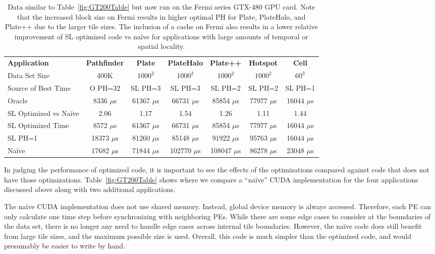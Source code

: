 \documentclass[preprint,nocopyrightspace]{styles/sigplanconf}
\begin{document}
\begin{table}
\centering
\begin{tabular}{|l|c|c|c|c|c|c|}
\hline
{\bf Application} & {\bf Pathfinder} & {\bf Plate} & {\bf PlateHalo} & {\bf Plate++} & {\bf Hotspot} & {\bf Cell} \\
Data Set Size	& 400K	& $1000^2$	& $1000^2$	& $1000^2$	& $1000^2$	& $60^3$	\\
\hline
Source of Best Time & O PH=32 	& SL PH=3	& SL PH=3	& SL PH=2	& SL PH=2	& SL PH=1	\\
Oracle		& 8336 $\mu$s	& 61367 $\mu$s	& 66731 $\mu$s	& 85854 $\mu$s	& 77977	$\mu$s	& 16044 $\mu$s	\\
SL Optimized vs Na\"{i}ve & 2.06 & 1.17		& 1.54		& 1.26		& 1.11		& 1.44		\\
SL Optimized Time & 8572 $\mu$s	& 61367	$\mu$s	& 66731	$\mu$s	& 85854	$\mu$s	& 77977	$\mu$s	& 16044	$\mu$s	\\
SL PH=1		& 18373	$\mu$s	& 81260	$\mu$s	& 85148	$\mu$s	& 91922	$\mu$s	& 95763	$\mu$s	& 16044	$\mu$s	\\
Na\"{i}ve	& 17682	$\mu$s	& 71844	$\mu$s	& 102770 $\mu$s	& 108047 $\mu$s	& 86278	$\mu$s	& 23048	$\mu$s	\\
\hline
\end{tabular}
\caption{
Data similar to Table~\ref{fig:GT200Table} but now run on the Fermi series
GTX-480 GPU card.  Note that the increased block size on Fermi results in
higher optimal PH for Plate, PlateHalo, and Plate++ due to the larger tile
sizes.  The inclusion of a cache on Fermi also results in a lower relative
improvement of SL optimized code vs na\"{i}ve for applications with large
amounts of temporal or spatial locality.
}
\label{fig:FermiTable}
\end{table}

In judging the performance of optimized code, it is important to
see the effects of the optimizations compared against code that
does not have those optimizations.  Table~\ref{fig:GT200Table}
shows where we compare a ``na\"{i}ve'' CUDA 
implementation for the four applications discussed above along
with two additional applications.  

The na\"{i}ve CUDA implementation does not use shared memory.
Instead, global device memory is always accessed.
Therefore, each PE can only calculate one time step 
before synchronizing with neighboring PEs.
While there are some edge cases to consider at the
boundaries of the data set, there is no longer any
need to handle edge cases across internal tile boundaries.
However, the na\"{i}ve code does still benefit from
large tile sizes, and the maximum possible size is used.
Overall, this code is much simpler than the optimized code,
and would presumably be easier to write by hand.
\end{document}
